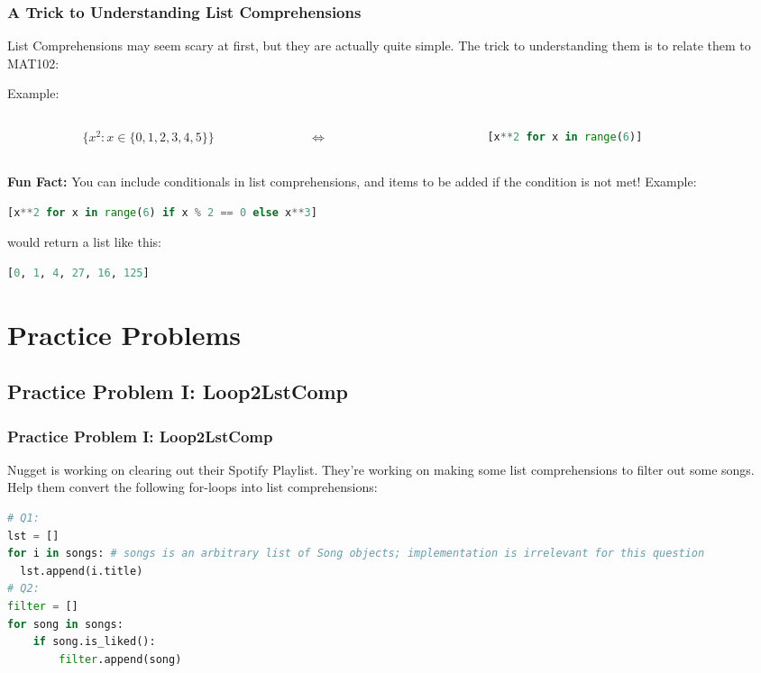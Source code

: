 \documentclass[hyperref={colorlinks,citecolor=blue,linkcolor=blue,urlcolor=blue}]{beamer}
\begin{document}
\begin{frame}[fragile]
  \frametitle{A Trick to Understanding List Comprehensions}
    List Comprehensions may seem scary at first, but they are actually quite simple. The trick to understanding them is to relate them to MAT102:

  Example:
  
  \begin{columns}[T]
    \begin{column}{0.4\textwidth}
    \begin{align*}
        \{x^2 : x \in \{0, 1, 2, 3, 4, 5\}\}
    \end{align*}
    \end{column}
    \hfill
    \begin{column}{0.1\textwidth}
    \begin{center}
    \Large $\iff$
    \end{center}
    \end{column}
    \hfill
    \begin{column}{0.5\textwidth}
    \begin{lstlisting}[language=Python, style=mystyle]
[x**2 for x in range(6)]
    \end{lstlisting}
    \end{column}
    \end{columns}


    \textbf{Fun Fact:} You can include conditionals in list comprehensions, and items to be added if the condition is not met! Example:
    \begin{lstlisting}[language=Python, style=mystyle]
[x**2 for x in range(6) if x % 2 == 0 else x**3]
    \end{lstlisting}
    would return a list like this:
    \begin{lstlisting}[language=Python, style=mystyle]
[0, 1, 4, 27, 16, 125]
    \end{lstlisting}
\end{frame}

\section{Practice Problems}
\subsection{Practice Problem I: Loop2LstComp}
\begin{frame}[fragile]
  
  \frametitle{Practice Problem I: Loop2LstComp}

  Nugget is working on clearing out their Spotify Playlist. They're working on making some list comprehensions to filter out some songs. Help them convert the following for-loops into list comprehensions:
  \begin{lstlisting}[language=Python, style=mystyle]
# Q1: 
lst = []
for i in songs: # songs is an arbitrary list of Song objects; implementation is irrelevant for this question 
  lst.append(i.title)
# Q2:
filter = []
for song in songs:
    if song.is_liked():
        filter.append(song)
\end{lstlisting}

\end{frame}
\end{document}
